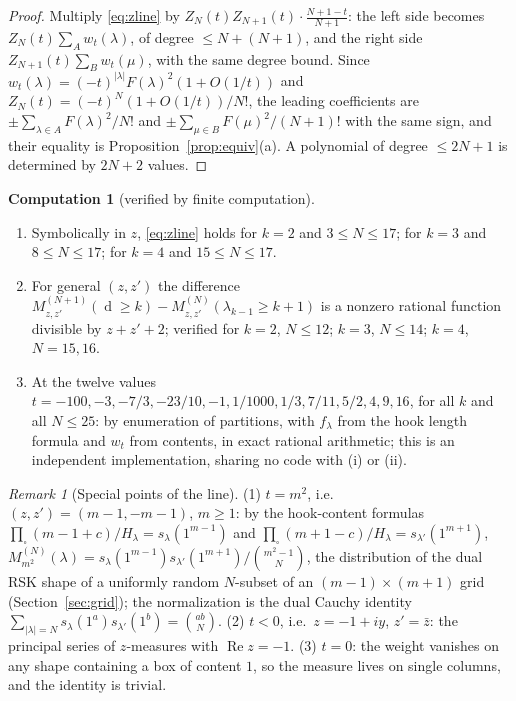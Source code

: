 \documentclass[11pt]{article}
\theoremstyle{definition}
\newtheorem{computation}[theorem]{Computation}
\theoremstyle{remark}
\newtheorem{remark}[theorem]{Remark}
\DeclareMathOperator{\Durfee}{d}
\begin{document}
\begin{proof}
Multiply \eqref{eq:zline} by $Z_N(t)Z_{N+1}(t)\cdot\frac{N+1-t}{N+1}$: the left side becomes $Z_N(t)\sum_Aw_t(\lambda)$, of degree $\le N+(N+1)$, and the right side $Z_{N+1}(t)\sum_Bw_t(\mu)$, with the same degree bound. Since $w_t(\lambda)=(-t)^{|\lambda|}F(\lambda)^2(1+O(1/t))$ and $Z_N(t)=(-t)^N(1+O(1/t))/N!$, the leading coefficients are $\pm\sum_{\lambda\in A}F(\lambda)^2/N!$ and $\pm\sum_{\mu\in B}F(\mu)^2/(N+1)!$ with the same sign, and their equality is Proposition~\ref{prop:equiv}(a). A polynomial of degree $\le2N+1$ is determined by $2N+2$ values.
\end{proof}

\begin{computation}[verified by finite computation]\label{comp:zline}
\begin{enumerate}[label=(\roman*)]
\item Symbolically in $z$, \eqref{eq:zline} holds for $k=2$ and $3\le N\le17$; for $k=3$ and $8\le N\le17$; for $k=4$ and $15\le N\le17$.
\item For general $(z,z')$ the difference $M^{(N+1)}_{z,z'}(\Durfee\ge k)-M^{(N)}_{z,z'}(\lambda_{k-1}\ge k+1)$ is a nonzero rational function divisible by $z+z'+2$; verified for $k=2$, $N\le12$; $k=3$, $N\le14$; $k=4$, $N=15,16$.
\item At the twelve values $t=-100,-3,-7/3,-23/10,-1,1/1000,1/3,7/11,5/2,4,9,16$, for all $k$ and all $N\le25$: by enumeration of partitions, with $f_\lambda$ from the hook length formula and $w_t$ from contents, in exact rational arithmetic; this is an independent implementation, sharing no code with (i) or (ii).
\end{enumerate}
\end{computation}

\begin{remark}[Special points of the line]
(1) $t=m^2$, i.e.\ $(z,z')=(m-1,-m-1)$, $m\ge1$: by the hook-content formulas $\prod_\square(m-1+c)/H_\lambda=s_\lambda(1^{m-1})$ and $\prod_\square(m+1-c)/H_\lambda=s_{\lambda'}(1^{m+1})$, $M^{(N)}_{m^2}(\lambda)=s_\lambda(1^{m-1})s_{\lambda'}(1^{m+1})/\binom{m^2-1}N$, the distribution of the dual RSK shape of a uniformly random $N$-subset of an $(m-1)\times(m+1)$ grid (Section~\ref{sec:grid}); the normalization is the dual Cauchy identity $\sum_{|\lambda|=N}s_\lambda(1^a)s_{\lambda'}(1^b)=\binom{ab}N$. (2) $t<0$, i.e.\ $z=-1+iy$, $z'=\bar z$: the principal series of $z$-measures with $\operatorname{Re}z=-1$. (3) $t=0$: the weight vanishes on any shape containing a box of content $1$, so the measure lives on single columns, and the identity is trivial.
\end{remark}
\end{document}

